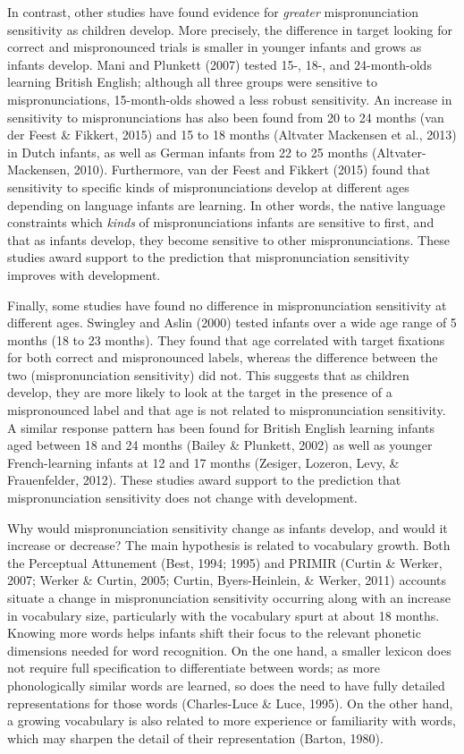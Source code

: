 \documentclass[man]{apa6}
\theoremstyle{definition}
\theoremstyle{definition}
\theoremstyle{definition}
\theoremstyle{remark}
\begin{document}
In contrast, other studies have found evidence for \emph{greater}
mispronunciation sensitivity as children develop. More precisely, the
difference in target looking for correct and mispronounced trials is
smaller in younger infants and grows as infants develop. Mani and
Plunkett (2007) tested 15-, 18-, and 24-month-olds learning British
English; although all three groups were sensitive to mispronunciations,
15-month-olds showed a less robust sensitivity. An increase in
sensitivity to mispronunciations has also been found from 20 to 24
months (van der Feest \& Fikkert, 2015) and 15 to 18 months (Altvater
Mackensen et al., 2013) in Dutch infants, as well as German infants from
22 to 25 months (Altvater-Mackensen, 2010). Furthermore, van der Feest
and Fikkert (2015) found that sensitivity to specific kinds of
mispronunciations develop at different ages depending on language
infants are learning. In other words, the native language constraints
which \emph{kinds} of mispronunciations infants are sensitive to first,
and that as infants develop, they become sensitive to other
mispronunciations. These studies award support to the prediction that
mispronunciation sensitivity improves with development.

Finally, some studies have found no difference in mispronunciation
sensitivity at different ages. Swingley and Aslin (2000) tested infants
over a wide age range of 5 months (18 to 23 months). They found that age
correlated with target fixations for both correct and mispronounced
labels, whereas the difference between the two (mispronunciation
sensitivity) did not. This suggests that as children develop, they are
more likely to look at the target in the presence of a mispronounced
label and that age is not related to mispronunciation sensitivity. A
similar response pattern has been found for British English learning
infants aged between 18 and 24 months (Bailey \& Plunkett, 2002) as well
as younger French-learning infants at 12 and 17 months (Zesiger,
Lozeron, Levy, \& Frauenfelder, 2012). These studies award support to
the prediction that mispronunciation sensitivity does not change with
development.

Why would mispronunciation sensitivity change as infants develop, and
would it increase or decrease? The main hypothesis is related to
vocabulary growth. Both the Perceptual Attunement (Best, 1994; 1995) and
PRIMIR (Curtin \& Werker, 2007; Werker \& Curtin, 2005; Curtin,
Byers-Heinlein, \& Werker, 2011) accounts situate a change in
mispronunciation sensitivity occurring along with an increase in
vocabulary size, particularly with the vocabulary spurt at about 18
months. Knowing more words helps infants shift their focus to the
relevant phonetic dimensions needed for word recognition. On the one
hand, a smaller lexicon does not require full specification to
differentiate between words; as more phonologically similar words are
learned, so does the need to have fully detailed representations for
those words (Charles-Luce \& Luce, 1995). On the other hand, a growing
vocabulary is also related to more experience or familiarity with words,
which may sharpen the detail of their representation (Barton, 1980).
\end{document}
